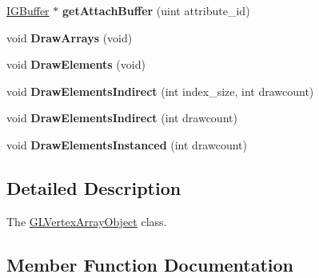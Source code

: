 \begin{DoxyCompactItemize}
\item 
\hypertarget{classEngine_1_1GLVertexArrayObject_a853c107480d1b74ef7f4fb04a54cb0d0}{}\hyperlink{classEngine_1_1IGBuffer}{I\+G\+Buffer} $\ast$ {\bfseries get\+Attach\+Buffer} (uint attribute\+\_\+id)\label{classEngine_1_1GLVertexArrayObject_a853c107480d1b74ef7f4fb04a54cb0d0}

\item 
\hypertarget{classEngine_1_1GLVertexArrayObject_a4cdfeb982fbc1461f40da899badc1375}{}void {\bfseries Draw\+Arrays} (void)\label{classEngine_1_1GLVertexArrayObject_a4cdfeb982fbc1461f40da899badc1375}

\item 
\hypertarget{classEngine_1_1GLVertexArrayObject_a14473fb252e4c84e06cb132d85a77c2e}{}void {\bfseries Draw\+Elements} (void)\label{classEngine_1_1GLVertexArrayObject_a14473fb252e4c84e06cb132d85a77c2e}

\item 
\hypertarget{classEngine_1_1GLVertexArrayObject_ab61900dca61790abfaebbcd43d8c8313}{}void {\bfseries Draw\+Elements\+Indirect} (int index\+\_\+size, int drawcount)\label{classEngine_1_1GLVertexArrayObject_ab61900dca61790abfaebbcd43d8c8313}

\item 
\hypertarget{classEngine_1_1GLVertexArrayObject_ade3dfd214cb75318e708abf2e86843a5}{}void {\bfseries Draw\+Elements\+Indirect} (int drawcount)\label{classEngine_1_1GLVertexArrayObject_ade3dfd214cb75318e708abf2e86843a5}

\item 
\hypertarget{classEngine_1_1GLVertexArrayObject_a4aa1b2050967f52bc0097898591b690c}{}void {\bfseries Draw\+Elements\+Instanced} (int drawcount)\label{classEngine_1_1GLVertexArrayObject_a4aa1b2050967f52bc0097898591b690c}

\end{DoxyCompactItemize}


\subsection{Detailed Description}
The \hyperlink{classEngine_1_1GLVertexArrayObject}{G\+L\+Vertex\+Array\+Object} class. 

\subsection{Member Function Documentation}
\hypertarget{classEngine_1_1GLVertexArrayObject_aa2fbd8bf27ddde48e6d6deab0a169a5f}{}

